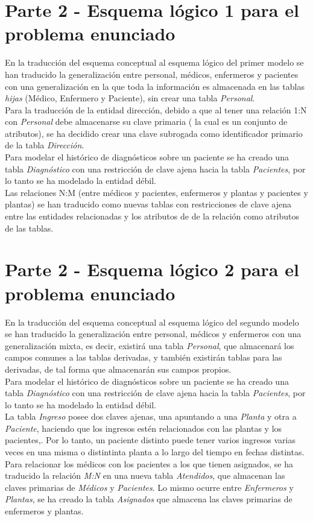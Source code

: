 \documentclass{article}
\begin{document}
\section{Parte 2 - Esquema lógico 1 para el problema enunciado}

En la traducción del esquema conceptual al esquema lógico del primer modelo se han traducido la generalización entre personal, médicos, enfermeros y pacientes con una generalización en la que toda la información es almacenada en las tablas \emph{hijas} (Médico, Enfermero y Paciente), sin crear una tabla \emph{Personal}.\\
Para la traducción de la entidad dirección, debido a que al tener una relación 1:N con \emph{Personal} debe almacenarse su clave primaria ( la cual es un conjunto de atributos), se ha decidido crear una clave subrogada como identificador primario de la tabla \emph{Dirección}.\\
Para modelar el histórico de diagnósticos sobre un paciente se ha creado una tabla \emph{Diagnóstico} con una restricción de clave ajena hacia la tabla \emph{Pacientes}, por lo tanto se ha modelado la entidad débil.\\
Las relaciones N:M (entre médicos y pacientes, enfermeros y plantas y pacientes y plantas) se han traducido como nuevas tablas con restricciones de clave ajena entre las entidades relacionadas y los atributos de de la relación como atributos de las tablas.

\section{Parte 2 - Esquema lógico 2 para el problema enunciado}

En la traducción del esquema conceptual al esquema lógico del segundo modelo se han traducido la generalización entre personal, médicos y enfermeros con una generalización mixta, es decir, existirá una tabla \emph{Personal}, que almacenará los campos comunes a las tablas derivadas, y también existirán tablas para las derivadas, de tal forma que almacenarán sus campos propios.\\
Para modelar el histórico de diagnósticos sobre un paciente se ha creado una tabla \emph{Diagnóstico} con una restricción de clave ajena hacia la tabla \emph{Pacientes}, por lo tanto se ha modelado la entidad débil.\\
La tabla \emph{Ingreso} posee dos claves ajenas, una apuntando a una \emph{Planta} y otra a \emph{Paciente}, haciendo que los ingresos estén relacionados con las plantas y los pacientes,. Por lo tanto, un paciente distinto puede tener varios ingresos varias veces en una misma o distintinta planta a lo largo del tiempo en fechas distintas.\\
Para relacionar los médicos con los pacientes a los que tienen asignados, se ha traducido la relación \emph{M:N} en una nueva tabla \emph{Atendidos}, que almacenan las claves primarias de \emph{Médicos} y \emph{Pacientes}. Lo mismo ocurre entre \emph{Enfermeros} y \emph{Plantas}, se ha creado la tabla \emph{Asignados} que almacena las claves primarias de enfermeros y plantas.\\
\end{document}
